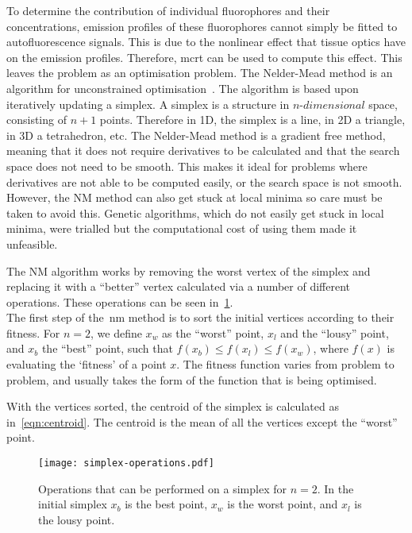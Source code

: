 To determine the contribution of individual fluorophores and their concentrations, emission profiles of these fluorophores cannot simply be fitted to autofluorescence signals.
This is due to the nonlinear effect that tissue optics have on the emission profiles.
Therefore, \gls*{mcrt} can be used to compute this effect.
This leaves the problem as an optimisation problem.
The Nelder-Mead method is an algorithm for unconstrained optimisation~\cite{nelder1965simplex}. 
The algorithm is based upon iteratively updating a simplex. 
A simplex is a structure in $n$-$dimensional$ space, consisting of $n+1$ points. 
Therefore in 1D, the simplex is a line, in 2D a triangle, in 3D a tetrahedron, etc. 
The Nelder-Mead method is a gradient free method, meaning that it does not require derivatives to be calculated and that the search space does not need to be smooth.
This makes it ideal for problems where derivatives are not able to be computed easily, or the search space is not smooth.
However, the NM method can also get stuck at local minima so care must be taken to avoid this.
Genetic algorithms, which do not easily get stuck in local minima, were trialled but the computational cost of using them made it unfeasible. 

The NM algorithm works by removing the worst vertex of the simplex and replacing it with a ``better'' vertex calculated via a number of different operations.
These operations can be seen in~\cref{fig:NM-operations}.\\

The first step of the~\gls*{nm} method is to sort the initial vertices according to their fitness.
For $n=2$, we define $x_w$ as the ``worst'' point, $x_l$ and the ``lousy'' point, and $x_b$ the ``best'' point, such that $f(x_b)\leq f(x_l)\leq f(x_w)$, where $f(x)$ is evaluating the `fitness' of a point $x$. 
The fitness function varies from problem to problem, and usually takes the form of the function that is being optimised.

With the vertices sorted, the centroid of the simplex is calculated as in~\cref{eqn:centroid}.
The centroid is the mean of all the vertices except the ``worst'' point.

\begin{figure}[!htbp]
    \centering
    \texttt{[image: simplex-operations.pdf]}
    \caption{Operations that can be performed on a simplex for $n=2$. In the initial simplex $x_b$ is the best point, $x_w$ is the worst point, and $x_l$ is the lousy point.}
    \label{fig:NM-operations}
\end{figure}

